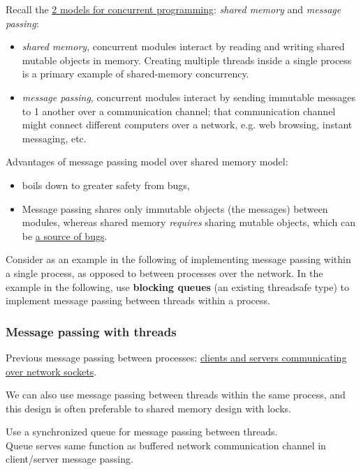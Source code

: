 \documentclass[10pt]{amsart}
\begin{document}
\begin{multicols*}{2}
Recall the \href{http://web.mit.edu/6.031/www/sp20/classes/20-concurrency/#two_models_for_concurrent_programming}{2 models for concurrent programming}: \emph{shared memory} and \emph{message passing}:
\begin{itemize}
	\item \emph{shared memory}, concurrent modules interact by reading and writing shared mutable objects in memory. Creating multiple threads inside a single process is a primary example of shared-memory concurrency.
	\item \emph{message passing}, concurrent modules interact by sending immutable messages to 1 another over a communication channel; that communication channel might connect different computers over a network, e.g. web browsing, instant messaging, etc.
\end{itemize}

Advantages of message passing model over shared memory model:
\begin{itemize}
	\item boils down to greater safety from bugs,
	\item Message passing shares only immutable objects (the messages) between modules, whereas shared memory \emph{requires} sharing mutable objects, which can be \href{http://web.mit.edu/6.031/www/sp20/classes/08-immutability/#risks_of_mutation}{a source of bugs}.
\end{itemize}

Consider as an example in the following of implementing message passing within a single process, as opposed to between processes over the network. In the example in the following, use \textbf{blocking queues} (an existing threadsafe type) to implement message passing between threads within a process.

\subsubsection{Message passing with threads}

Previous message passing between processes: \href{http://web.mit.edu/6.005/www/fa15/classes/21-sockets-networking/#network_sockets}{clients and servers communicating over network sockets}. 

We can also use message passing between threads within the same process, and this design is often preferable to shared memory design with locks.

Use a synchronized queue for message passing between threads. \\
Queue serves same function as buffered network communication channel in client/server message passing.


\end{multicols*}
\end{document}

